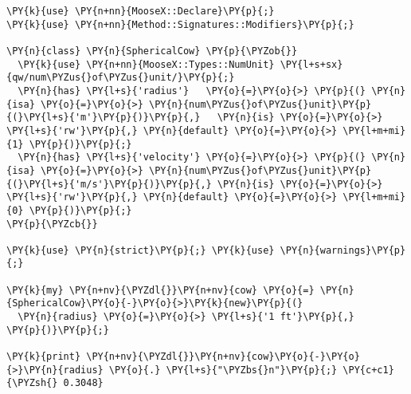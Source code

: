 \begin{Verbatim}[commandchars=\\\{\}]
\PY{k}{use} \PY{n+nn}{MooseX::Declare}\PY{p}{;}
\PY{k}{use} \PY{n+nn}{Method::Signatures::Modifiers}\PY{p}{;}

\PY{n}{class} \PY{n}{SphericalCow} \PY{p}{\PYZob{}}
  \PY{k}{use} \PY{n+nn}{MooseX::Types::NumUnit} \PY{l+s+sx}{qw/num\PYZus{}of\PYZus{}unit/}\PY{p}{;}
  \PY{n}{has} \PY{l+s}{'radius'}   \PY{o}{=}\PY{o}{>} \PY{p}{(} \PY{n}{isa} \PY{o}{=}\PY{o}{>} \PY{n}{num\PYZus{}of\PYZus{}unit}\PY{p}{(}\PY{l+s}{'m'}\PY{p}{)}\PY{p}{,}   \PY{n}{is} \PY{o}{=}\PY{o}{>} \PY{l+s}{'rw'}\PY{p}{,} \PY{n}{default} \PY{o}{=}\PY{o}{>} \PY{l+m+mi}{1} \PY{p}{)}\PY{p}{;}
  \PY{n}{has} \PY{l+s}{'velocity'} \PY{o}{=}\PY{o}{>} \PY{p}{(} \PY{n}{isa} \PY{o}{=}\PY{o}{>} \PY{n}{num\PYZus{}of\PYZus{}unit}\PY{p}{(}\PY{l+s}{'m/s'}\PY{p}{)}\PY{p}{,} \PY{n}{is} \PY{o}{=}\PY{o}{>} \PY{l+s}{'rw'}\PY{p}{,} \PY{n}{default} \PY{o}{=}\PY{o}{>} \PY{l+m+mi}{0} \PY{p}{)}\PY{p}{;}
\PY{p}{\PYZcb{}}

\PY{k}{use} \PY{n}{strict}\PY{p}{;} \PY{k}{use} \PY{n}{warnings}\PY{p}{;}

\PY{k}{my} \PY{n+nv}{\PYZdl{}}\PY{n+nv}{cow} \PY{o}{=} \PY{n}{SphericalCow}\PY{o}{-}\PY{o}{>}\PY{k}{new}\PY{p}{(}
  \PY{n}{radius} \PY{o}{=}\PY{o}{>} \PY{l+s}{'1 ft'}\PY{p}{,}
\PY{p}{)}\PY{p}{;}

\PY{k}{print} \PY{n+nv}{\PYZdl{}}\PY{n+nv}{cow}\PY{o}{-}\PY{o}{>}\PY{n}{radius} \PY{o}{.} \PY{l+s}{"\PYZbs{}n"}\PY{p}{;} \PY{c+c1}{\PYZsh{} 0.3048}
\end{Verbatim}
